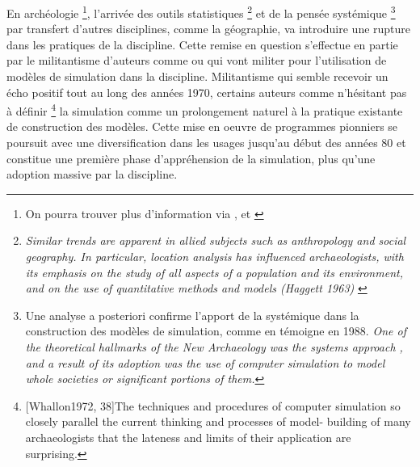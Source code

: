 En archéologie \footnote{On pourra trouver plus d'information via \autocite{Kohler2011}, et \autocite{Lake2013}}, l'arrivée des outils statistiques \footnote{\textit{Similar trends are apparent in allied subjects such as anthropology and social geography. In particular, location analysis has influenced archaeologists, with its emphasis on the study of all aspects of a population and its environment, and on the use of quantitative methods and models (Haggett 1963)} \autocite{Doran1970}} et de la pensée systémique \autocite{Flannery1968, Binford1968} \footnote{Une analyse a posteriori confirme l'apport de la systémique dans la construction des modèles de simulation, comme en témoigne \textcite{Aldenderfer1998} en 1988. \textit{One of the theoretical hallmarks of the \textit{New Archaeology} was the systems approach \autocite{Aldenderfer1991}, and a result of its adoption was the use of computer simulation to model whole societies or significant portions of them.}} par transfert d'autres disciplines, comme la géographie, va introduire une rupture dans les pratiques de la discipline. Cette remise en question s'effectue en partie par le militantisme d'auteurs comme \textcite{Clarke1968} ou \textcite{Doran1970} qui vont militer pour l'utilisation de modèles de simulation dans la discipline. Militantisme qui semble recevoir un écho positif tout au long des années 1970, certains auteurs comme \textcite[38]{Whallon1972} n'hésitant pas à définir \footnote{ [Whallon1972, 38]{The techniques and procedures of computer simulation so closely parallel the current thinking and processes of model- building of many archaeologists that the lateness and limits of their application are surprising.}} la simulation comme un prolongement naturel à la pratique existante de construction des modèles. Cette mise en oeuvre de programmes pionniers se poursuit avec une diversification dans les usages jusqu'au début des années 80 et constitue une première phase d'appréhension de la simulation, plus qu'une adoption massive par la discipline. \autocite{Lake2013}



